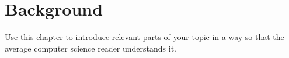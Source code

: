 \setchaptertoc
\chapter{Background}\label{chp:background}

\begin{summary}
    Use this chapter to introduce relevant parts of your topic in a way so that the average computer science reader understands it.
\end{summary}